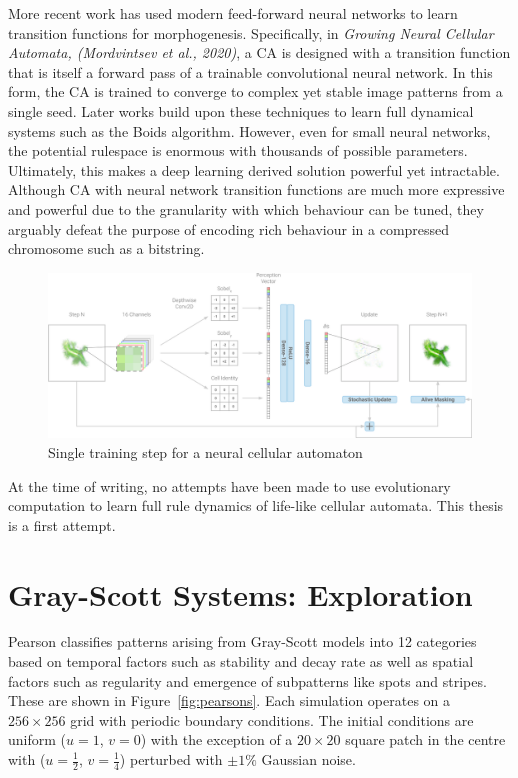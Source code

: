 More recent work has used modern feed-forward neural networks to learn transition functions for morphogenesis. Specifically, in \textit{Growing Neural Cellular Automata, (Mordvintsev et al., 2020)}\cite{mordvintsev2020growing}, a CA is designed with a transition function that is itself a forward pass of a trainable convolutional neural network. In this form, the CA is trained to converge to complex yet stable image patterns from a single seed. Later works build upon these techniques to learn full dynamical systems such as the Boids algorithm\cite{grattarola2021learning}. However, even for small neural networks, the potential rulespace is enormous with thousands of possible parameters. Ultimately, this makes a deep learning derived solution powerful yet intractable. Although CA with neural network transition functions are much more expressive and powerful due to the granularity with which behaviour can be tuned, they arguably defeat the purpose of encoding rich behaviour in a compressed chromosome such as a bitstring.\\

\begin{figure}[!h]
\centering
\includegraphics[width=\textwidth]{images/nca.png}
\caption{Single training step for a neural cellular automaton\cite{mordvintsev2020growing}}
\label{fig:nca}
\end{figure}

At the time of writing, no attempts have been made to use evolutionary computation to learn full rule dynamics of life-like cellular automata. This thesis is a first attempt.

\section{Gray-Scott Systems: Exploration} \label{sec: gs-exploration}

Pearson\cite{pearson1993complex} classifies patterns arising from Gray-Scott models into 12 categories  based on temporal factors such as stability and decay rate as well as spatial factors such as regularity and emergence of subpatterns like spots and stripes. These are shown in Figure~\ref{fig:pearsons}. Each simulation operates on a $256 \times 256$ grid with periodic boundary conditions. The initial conditions are uniform ($u = 1$, $v = 0$) with the exception of a $20 \times 20$ square patch in the centre with ($u=\frac{1}{2}$, $v=\frac{1}{4}$) perturbed with $\pm 1\%$ Gaussian noise.\\

